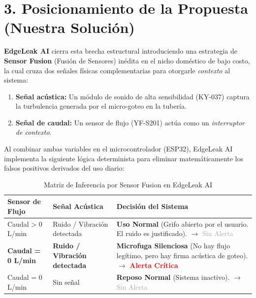 \documentclass[11pt,a4paper]{article}
\begin{document}
\vspace{0.8cm}

\section*{3. Posicionamiento de la Propuesta (Nuestra Solución)}

\textbf{EdgeLeak AI} cierra esta brecha estructural introduciendo una estrategia de \textbf{Sensor Fusion} (Fusión de Sensores) inédita en el nicho doméstico de bajo costo, la cual cruza dos señales físicas complementarias para otorgarle \textit{contexto} al sistema:

\begin{enumerate}
    \item \textbf{Señal acústica:} Un módulo de sonido de alta sensibilidad (KY-037) captura la turbulencia generada por el micro-goteo en la tubería.
    \item \textbf{Señal de caudal:} Un sensor de flujo (YF-S201) actúa como un \textit{interruptor de contexto}.
\end{enumerate}

\vspace{0.3cm}
Al combinar ambas variables en el microcontrolador (ESP32), EdgeLeak AI implementa la siguiente lógica determinista para eliminar matemáticamente los falsos positivos derivados del uso diario:

\begin{table}[htpb]
    \centering
    \caption{Matriz de Inferencia por Sensor Fusion en EdgeLeak AI}
    \begin{tabularx}{0.95\textwidth}{l l X}
        \toprule
        \textbf{Sensor de Flujo} & \textbf{Señal Acústica} & \textbf{Decisión del Sistema} \\
        \midrule
        Caudal > 0 L/min & Ruido / Vibración detectada & \textbf{Uso Normal} (Grifo abierto por el usuario. El ruido es justificado). $\rightarrow$ \textcolor{darkgray}{Sin Alerta} \\
        \addlinespace
        \textbf{Caudal = 0 L/min} & \textbf{Ruido / Vibración detectada} & \textbf{Microfuga Silenciosa} (No hay flujo legítimo, pero hay firma acústica de goteo). $\rightarrow$ \textcolor{red}{\textbf{Alerta Crítica}} \\
        \addlinespace
        Caudal = 0 L/min & Sin señal & \textbf{Reposo Normal} (Sistema inactivo). $\rightarrow$ \textcolor{darkgray}{Sin Alerta} \\
        \bottomrule
    \end{tabularx}
\end{table}
\end{document}
